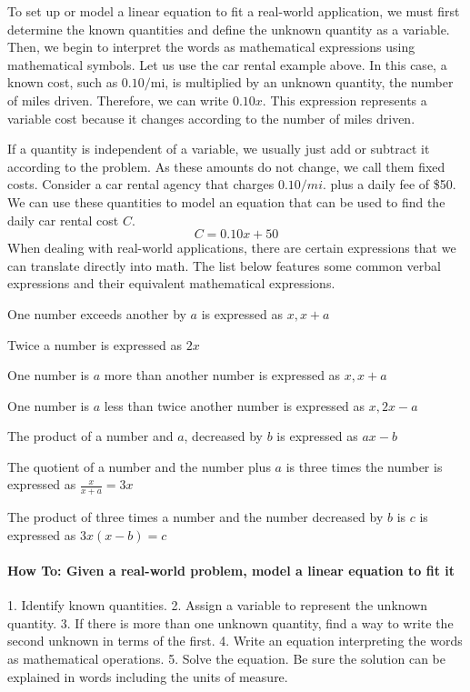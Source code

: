 To set up or model a linear equation to fit a real-world application, we must first determine the known quantities and define the unknown quantity as a variable. Then, we begin to interpret the words as mathematical expressions using mathematical symbols. Let us use the car rental example above. In this case, a known cost, such as $0.10/\text{mi}$, is multiplied by an unknown quantity, the number of miles driven. Therefore, we can write $0.10x$. This expression represents a variable cost because it changes according to the number of miles driven.

If a quantity is independent of a variable, we usually just add or subtract it according to the problem. As these amounts do not change, we call them fixed costs. Consider a car rental agency that charges $0.10/mi.$ plus a daily fee of \$50. We can use these quantities to model an equation that can be used to find the daily car rental cost $C$.
$$
C = 0.10x + 50
$$
When dealing with real-world applications, there are certain expressions that we can translate directly into math. The list below features some common verbal expressions and their equivalent mathematical expressions.

One number exceeds another by $a$ is expressed as $x, x + a$ 
                    
Twice a number is expressed as $2x$

One number is $a$ more than another number is expressed as $x, x + a$
                     
One number is $a$ less than twice another number is expressed as $x, 2x - a$ 
 
The product of a number and $a$, decreased by $b$ is expressed as $ax - b$  
                     
The quotient of a number and the number plus $a$ is three times the number is expressed as $\frac{x}{x+a} = 3x$

The product of three times a number and the number decreased by $b$ is $c$ is expressed as  $3x(x-b) = c$ 

\paragraph{How To: Given a real-world problem, model a linear equation to fit it}

1. Identify known quantities.
2. Assign a variable to represent the unknown quantity.
3. If there is more than one unknown quantity, find a way to write the second unknown in terms of the first.
4. Write an equation interpreting the words as mathematical operations.
5. Solve the equation. Be sure the solution can be explained in words including the units of measure.

